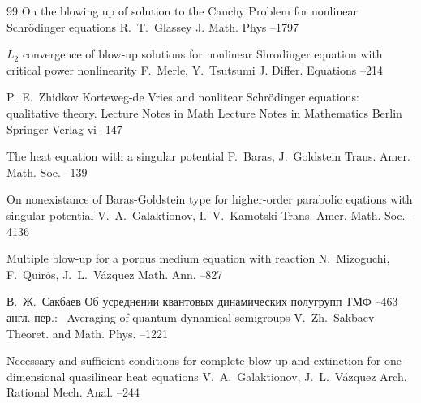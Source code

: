 \begin{thebibliography}{99}
\paper On the blowing up of solution to the Cauchy Problem for nonlinear Schr\"odinger equations
\by R.~T.~Glassey
\jour J. Math. Phys
--1797


\paper $L_2$ convergence of blow-up solutions for nonlinear Shrodinger equation with critical power nonlinearity
\by F.~Merle, Y.~Tsutsumi
\jour J. Differ. Equations 
--214


\by P.~E.~Zhidkov
\paper Korteweg-de Vries and nonlitear Schr\"odinger equations: qualitative theory. Lecture Notes in Math
\serial Lecture Notes in Mathematics
\publaddr Berlin
\publ Springer-Verlag
\totalpages vi+147



\paper The heat equation with a singular potential
\by P.~Baras, J.~Goldstein
\jour Trans. Amer. Math. Soc.
--139



\paper On nonexistance of Baras-Goldstein type for higher-order parabolic eqations with singular potential
\by V.~A.~Galaktionov, I.~V.~Kamotski
\jour Trans. Amer. Math. Soc.
--4136




\paper Multiple blow-up for a porous medium equation with reaction
\by N.~Mizoguchi, F.~Quir\'os, J.~L.~V\'azquez
\jour Math. Ann.
--827




\by В.~Ж.~Сакбаев
\paper Об усреднении квантовых динамических полугрупп
\jour ТМФ
--463
\transl англ. пер.:~
\paper Averaging of quantum dynamical semigroups
\by V.~Zh.~Sakbaev 
\jour Theoret. and Math. Phys.
--1221


\paper Necessary and sufficient conditions for complete blow-up and extinction for one-dimensional quasilinear heat equations
\by V.~A.~Galaktionov, J.~L.~V\'azquez
\jour Arch. Rational Mech. Anal.
--244



\end{thebibliography}

